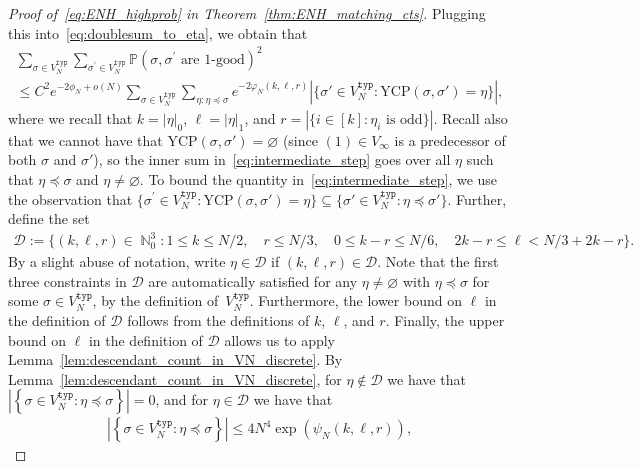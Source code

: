 \documentclass[11pt]{article}
\numberwithin{equation}{section}
\DeclareMathOperator{\N}{\mathbb{N}} %
\newcommand{\ycp}{\mathrm{YCP}} %
\def\cD{{\mathcal D}}
\theoremstyle{definition}
\begin{document}
\begin{proof}[Proof of~\eqref{eq:ENH_highprob} in Theorem~\ref{thm:ENH_matching_cts}]
Plugging this into~\eqref{eq:doublesum_to_eta}, we obtain that
\begin{multline}\label{eq:intermediate_step}
      \sum_{\sigma \in V_N^{\mathtt{typ}}} \sum_{\sigma^\prime \in V_N^{\mathtt{typ}}} \mathbb{P} \left( \sigma, \sigma^\prime \text{ are 1-good}  \right)^{2} \\
        \leq    C^{2}  e^{-2\phi_N+o(N)}
        \sum_{\sigma \in V_N^{\mathtt{typ}}} \sum_{\eta: \eta \preccurlyeq \sigma}   e^{- 2\varphi_N(k,\ell,r)}
        \left|\{\sigma' \in V_N^{\mathtt{typ}}: \ycp(\sigma, \sigma') = \eta\}\right|,
\end{multline}
where we recall that $k = |\eta|_0$, $\ell = |\eta|_1$, and $r = |\{i\in [k]: \eta_i \text{ is odd}\}|$. 
Recall also that we cannot have that $\ycp(\sigma, \sigma') = \varnothing$ (since $(1) \in V_{\infty}$ is a predecessor of both $\sigma$ and $\sigma'$), so the inner sum in~\eqref{eq:intermediate_step} goes over all $\eta$ such that $\eta \preccurlyeq \sigma$ and $\eta \neq \varnothing$. 
To bound the quantity in~\eqref{eq:intermediate_step}, we use the observation that $\{\sigma^\prime \in V_N^{\mathtt{typ}}: \ycp(\sigma, \sigma') = \eta\} \subseteq \{\sigma' \in V_N^{\mathtt{typ}}: \eta \preccurlyeq \sigma' \}$. Further, define the set 
\begin{align*}%
     \cD := \big\{ (k,\ell,r) \in \N_0^3: 1\leq k\leq N/2, \quad r\leq N/3, \quad 0 \leq k-r\leq N/6,\quad  2k-r\leq \ell < N/3 + 2k-r\big\}.
\end{align*}
By a slight abuse of notation, write $\eta \in \cD$ if $(k,\ell, r)\in \cD$. Note that the first three constraints in $\cD$ are automatically satisfied for any $\eta \neq \varnothing$ with $ \eta \preccurlyeq \sigma $ for some $\sigma \in V_{N}^{\mathtt{typ}}$, by the definition of~$V_{N}^{\mathtt{typ}}$. 
Furthermore, the lower bound on $\ell$ in the definition of $\cD$ follows from the definitions of $k$, $\ell$, and $r$.
Finally, the upper bound on $\ell$ in the definition of $\cD$ allows us to apply Lemma~\ref{lem:descendant_count_in_VN_discrete}.
By Lemma~\ref{lem:descendant_count_in_VN_discrete},  
for $\eta \notin \cD$ 
we have that 
$  \left| \left\{ \sigma \in V_{N}^{\mathtt{typ}} : \eta \preccurlyeq \sigma \right\} \right| = 0$, 
and for $\eta \in \cD$ we have that
\begin{align*}
     \left| \left\{ \sigma \in V_{N}^{\mathtt{typ}} : \eta \preccurlyeq \sigma \right\} \right| 
     \leq 
     4 N^{4} \exp \left(\psi_N(k,\ell,r) \right),
\end{align*} 

\end{proof}
\end{document}
